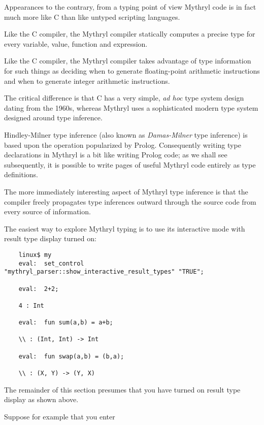 Appearances to the contrary, from a typing point of view Mythryl code 
is in fact much more like C than like untyped scripting languages.

Like the C compiler, the Mythryl compiler statically computes a 
precise type for every variable, value, function and expression.

Like the C compiler, the Mythryl compiler takes advantage of type 
information for such things as deciding when to generate 
floating-point arithmetic instructions and when to generate integer 
arithmetic instructions.

The critical difference is that C has a very simple, {\it ad hoc} 
type system design dating from the 1960s, whereas Mythryl uses a 
sophisticated modern type system designed around  type inference.

Hindley-Milner type inference 
(also known as {\it Damas-Milner} type inference) is based upon the 
 operation 
popularized by Prolog.  Consequently writing type declarations in Mythryl is a bit 
like writing Prolog code;  as we shall see subsequently, it is possible 
to write pages of useful Mythryl code entirely as type definitions.

The more immediately interesting aspect of Mythryl type inference is that 
the compiler freely propagates type inferences outward through the source 
code from every source of information.

The easiest way to explore Mythryl typing is to use its interactive mode 
with result type display turned on:

\begin{verbatim}
    linux$ my
    eval:  set_control  "mythryl_parser::show_interactive_result_types" "TRUE";

    eval:  2+2;

    4 : Int

    eval:  fun sum(a,b) = a+b;

    \\ : (Int, Int) -> Int

    eval:  fun swap(a,b) = (b,a);

    \\ : (X, Y) -> (Y, X)

\end{verbatim}

The remainder of this section presumes that you have turned on 
result type display as shown above.

Suppose for example that you enter

